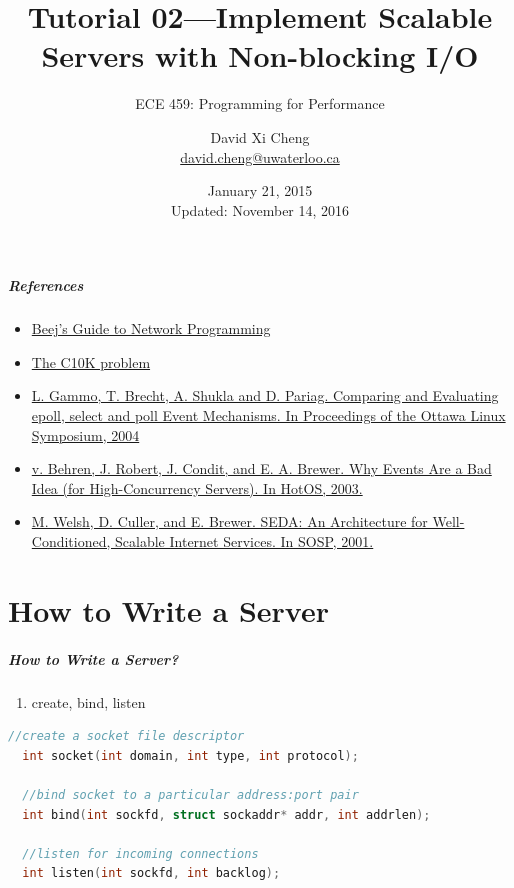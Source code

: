 \documentclass[aspectratio=43]{beamer}
\title{Tutorial 02---Implement Scalable Servers with Non-blocking I/O}
\subtitle{ECE 459: Programming for Performance}
\author{David Xi Cheng \\ \href{mailto:david.cheng@uwaterloo.ca}{david.cheng@uwaterloo.ca}}
\institute{University of Waterloo}
\date{January 21, 2015 \\ Updated: November 14, 2016}
\begin{document}
\begin{frame}[plain]
  \titlepage
\end{frame}

\begin{frame}
  \frametitle{References}

  \begin{itemize}
  	\item \href{http://beej.us/guide/bgnet/}{Beej's Guide to Network Programming}
  	\item \href{http://www.kegel.com/c10k.html}{The C10K problem}
	\item \href{https://cs.uwaterloo.ca/~brecht/papers/getpaper.php?file=ols-2004.pdf}{L. Gammo, T. Brecht, A. Shukla and D. Pariag. Comparing and Evaluating epoll, select and poll Event Mechanisms. In Proceedings of the Ottawa Linux Symposium, 2004}
	\item \href{https://www.usenix.org/legacy/events/hotos03/tech/full_papers/vonbehren/vonbehren.pdf}{v. Behren, J. Robert, J. Condit, and E. A. Brewer. Why Events Are a Bad Idea (for High-Concurrency Servers). In HotOS, 2003.}
	\item \href{http://www.eecs.harvard.edu/~mdw/papers/seda-sosp01.pdf}{M. Welsh, D. Culler, and E. Brewer. SEDA: An Architecture for Well-Conditioned, Scalable Internet Services. In SOSP, 2001.}
  \end{itemize}
  \end{frame}

\part{How to Write a Server}
\begin{frame}
\partpage
\end{frame}
\begin{frame}[fragile]
  \frametitle{How to Write a Server?}
  \begin{enumerate}
  	\item create, bind, listen 
  \end{enumerate}
  
  \begin{lstlisting}[language=C,basicstyle=\ttfamily\footnotesize,commentstyle=\color{commgreen},keywordstyle=\color{blue}]
  //create a socket file descriptor
  int socket(int domain, int type, int protocol);
 
  //bind socket to a particular address:port pair
  int bind(int sockfd, struct sockaddr* addr, int addrlen);
  
  //listen for incoming connections
  int listen(int sockfd, int backlog);
  \end{lstlisting}
\end{frame}
\end{document}
